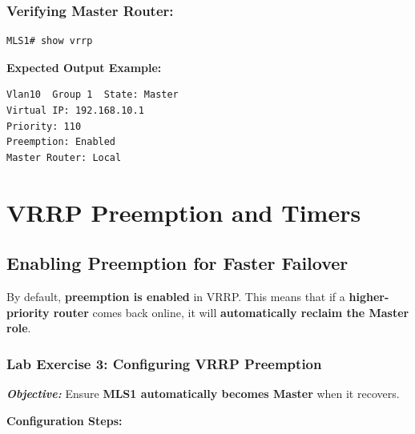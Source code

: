 \documentclass[a4paper]{book}
\begin{document}
\subsubsection{Verifying Master Router:}
\begin{lstlisting}
MLS1# show vrrp
\end{lstlisting}
\textbf{Expected Output Example:}
\begin{lstlisting}
Vlan10  Group 1  State: Master
Virtual IP: 192.168.10.1
Priority: 110
Preemption: Enabled
Master Router: Local
\end{lstlisting}


\vspace{1.5em}

\section{VRRP Preemption and Timers}

\subsection{Enabling Preemption for Faster Failover}
By default, \textbf{preemption is enabled} in VRRP. This means that if a \textbf{higher-priority router} 
comes back online, it will \textbf{automatically reclaim the Master role}.

\subsubsection{Lab Exercise 3: Configuring VRRP Preemption}
\textbf{\textit{Objective:}} Ensure \textbf{MLS1 automatically becomes Master} when it recovers.
\vspace{1.5em}

\textbf{Configuration Steps:}

\vspace{1.5em}

\end{document}
